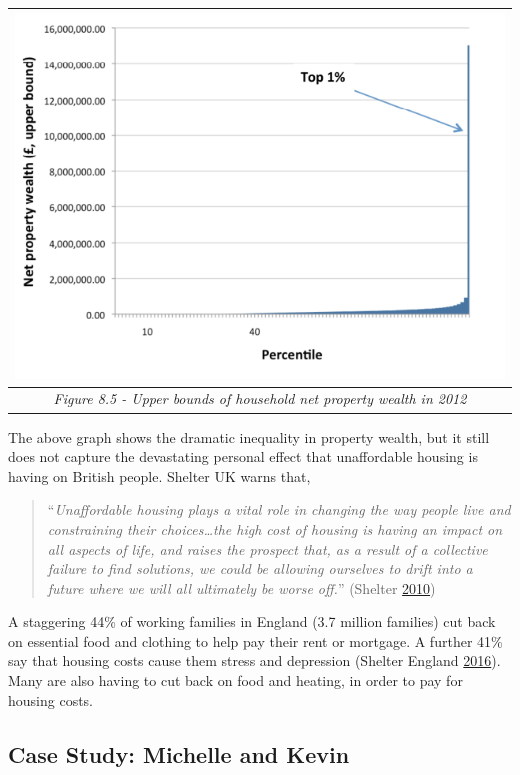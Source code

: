 \documentclass[]{tufte-handout}
\begin{document}
\begin{longtable}[]{@{}c@{}}
\toprule
\includegraphics{ChapterPictures/8-5-Householdnetpropertywealth2012.png}\tabularnewline
\midrule
\endhead
\emph{Figure 8.5 - Upper bounds of household net property wealth in
2012}\tabularnewline
\bottomrule
\end{longtable}

The above graph shows the dramatic inequality in property wealth, but it
still does not capture the devastating personal effect that unaffordable
housing is having on British people. Shelter UK warns that,

\begin{quote}
``\emph{Unaffordable housing plays a vital role in changing the way
people live and constraining their choices\ldots{}the high cost of
housing is having an impact on all aspects of life, and raises the
prospect that, as a result of a collective failure to find solutions, we
could be allowing ourselves to drift into a future where we will all
ultimately be worse off.}'' (Shelter
\protect\hyperlink{ref-Shelter2010}{2010})
\end{quote}

A staggering 44\% of working families in England (3.7 million families)
cut back on essential food and clothing to help pay their rent or
mortgage. A further 41\% say that housing costs cause them stress and
depression (Shelter England
\protect\hyperlink{ref-ShelterEngland2016}{2016}). Many are also having
to cut back on food and heating, in order to pay for housing costs.

\hypertarget{case-study-michelle-and-kevin}{%
\subsection{Case Study: Michelle and
Kevin}\label{case-study-michelle-and-kevin}}
\end{document}
